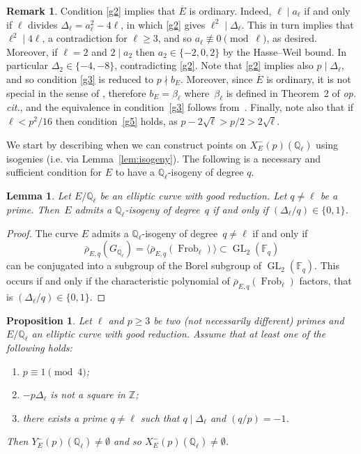 \documentclass[12pt]{amsart}
\numberwithin{equation}{section}
\newtheorem{lemma}[equation]{Lemma}
\newtheorem{proposition}[equation]{Proposition}
\theoremstyle{definition}
\newtheorem{remark}[equation]{Remark}
\newcommand{\F}{\mathbb{F}}
\newcommand{\Q}{\mathbb{Q}}
\newcommand{\Z}{\mathbb{Z}}
\newcommand{\rhobar}{{\overline{\rho}}}
\newcommand{\Xp}{X_E^{-}(p)}
\DeclareMathOperator{\GL}{GL}
\DeclareMathOperator{\Frob}{Frob}
\newcommand{\oE}{\overline{E}}
\begin{document}
\begin{remark} \label{rmk:good}
Condition \eqref{g2} implies that $\oE$ is ordinary. Indeed, $\ell\mid a_\ell$ if and only if $\ell$ divides $\Delta_\ell=a_\ell^2-4\ell$, in which \eqref{g2} gives $\ell^2\mid \Delta_\ell$. This in turn implies that $\ell^2\mid 4\ell$, a contradiction for $\ell \geq 3$, and so $a_\ell \not\equiv 0 \pmod{\ell}$, as desired.
    Moreover, if $\ell=2$ and $2\mid a_2$ then $a_2\in \{-2,0,2\}$ by the Hasse--Weil bound. In particular $\Delta_2 \in \{-4,-8\}$, contradicting \eqref{g2}. Note that \eqref{g2} implies also $p\mid \Delta_\ell$, and so condition \eqref{g3} is reduced to $p\nmid b_E$.
    Moreover, since $\oE$ is ordinary, it is not special in the sense of \cite[Definition~1]{Centeleghe}, therefore $b_E = \beta_\ell$ where~$\beta_\ell$ is defined in Theorem~2 of {\it op. cit.}, and the equivalence in condition~\eqref{g3} follows from~\cite[Corollary 4]{symplectic}. Finally, note also that if $\ell < p^2 / 16$ then condition~\eqref{g5} holds, as $p - 2 \sqrt{\ell} > p/2 > 2\sqrt{\ell}$.
\end{remark}
We start by describing when we can construct points on $\Xp(\Q_\ell)$
using isogenies (i.e. via Lemma~\ref{lem:isogeny}).
The following is a necessary and sufficient condition for $E$ to have a $\Q_\ell$-isogeny of degree $q$.
\begin{lemma}\label{good}
		Let $E/\Q_\ell$ be an elliptic curve with good reduction. Let $q \neq \ell$ be a prime.
		Then~$E$ admits a $\Q_\ell$-isogeny of degree~$q$ if and only if $(\Delta_{\ell}/q)\in \{0, 1\}$.
	\end{lemma}
	\begin{proof}
The curve $E$ admits a $\Q_\ell$-isogeny of degree~$q \neq \ell$ if and only if 
$$\rhobar_{E,q}(G_{\Q_\ell})= \langle \rhobar_{E,q}(\Frob_{\ell}) \rangle \subset \GL_2(\F_q)$$ can be conjugated into a subgroup of the Borel subgroup of $\GL_2(\F_q)$. This occurs if and only if the characteristic polynomial of
		$\rhobar_{E,q}(\Frob_{\ell})$ factors, that is $(\Delta_{\ell}/q)\in \{0, 1\}$.
\end{proof}
\begin{proposition}\label{prop:good1}
Let $\ell$ and $p \geq 3$ be two (not necessarily different) primes and $E/\Q_\ell$ an elliptic curve with good reduction.
Assume that at least one of the following holds:
\begin{enumerate}
\item $p\equiv 1 \pmod 4$;
 \item $-p\Delta_\ell$ is not a square in $\Z$;
\item  there exists a prime $q\neq \ell$ such that $q\mid \Delta_\ell$ and $(q/p)=-1$.
    
\end{enumerate}
Then $Y_E^-(p)(\Q_\ell) \neq \emptyset$ and so $X_E^{-}(p)(\Q_\ell)\neq \emptyset$.
\end{proposition}
\end{document}
